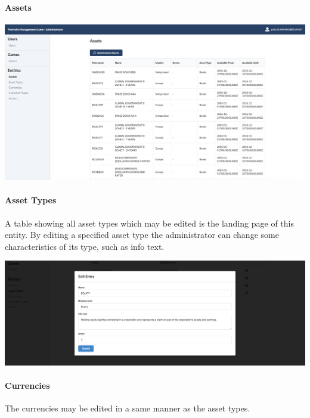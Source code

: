 \paragraph{Assets}
\begin{center}
  \includegraphics[scale=0.2]{img/application-overview/administrator/entities_assets.png}
\end{center}

\paragraph{Asset Types}
A table showing all asset types which may be edited is the landing page of this entity. By editing a specified asset type the administrator can change some characteristics of its type, such as info text.
\begin{center}
  \includegraphics[scale=0.2]{img/application-overview/administrator/entities_asset_types.png}
\end{center}

\paragraph{Currencies}
The currencies may be edited in a same manner as the asset types.

